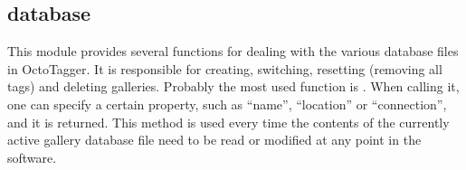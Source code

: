 \subsection{database}

This module provides several functions for dealing with the various database
files in OctoTagger. It is responsible for creating, switching, resetting
(removing all tags) and deleting galleries. Probably the most used function is
. When calling it, one can specify a certain
property, such as ``name'', ``location'' or ``connection'', and it is returned.
This method is used every time the contents of the currently active gallery
database file need to be read or modified at any point in the software.
